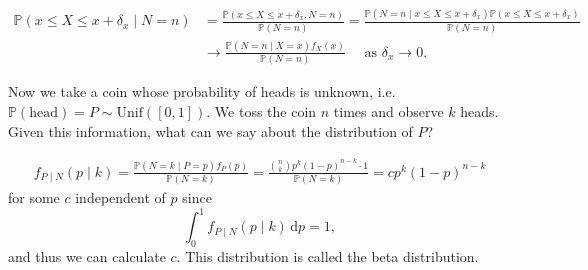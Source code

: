 \begin{align*}
    \mathbb{P} (x \le X \le x + \delta _x \mid N = n) &= \frac{\mathbb{P} (x \le X \le x + \delta _x, N = n)}{\mathbb{P} (N = n)} = \frac{\mathbb{P} (N = n \mid x \le X \le x + \delta _x) \mathbb{P} (x \le X \le x + \delta _x)}{\mathbb{P} (N = n)} \\
    &\to \frac{\mathbb{P} (N = n \mid X = x) f_X(x)}{\mathbb{P} (N = n)} \quad \text{ as } \delta _x \to 0. 
\end{align*}

\begin{eg}
    Now we take a coin whose probability of heads is unknown, i.e. \(\mathbb{P} (\text{head}) = P \sim \mathrm{Unif}([0, 1]) \). We toss the coin \(n\) times and observe \(k\) heads. Given this information, what can we say about the distribution of \(P\)?   
\end{eg}

\begin{explanation}
    \begin{align*}
        f_{P \mid N} (p \mid k) = \frac{\mathbb{P} (N = k \mid P = p) f_P(p)}{\mathbb{P} (N = k)} = \frac{\binom{n}{k} p^k (1 - p)^{n - k} \cdot 1}{\mathbb{P} (N = k)} = c p^k (1 - p)^{n - k}
    \end{align*}
    for some \(c\) independent of \(p\) since 
    \[
        \int _0^1 f_{P \mid N} (p \mid k) \, \mathrm{d} p = 1, 
    \]  
    and thus we can calculate \(c\). This distribution is called the beta distribution. 
\end{explanation}